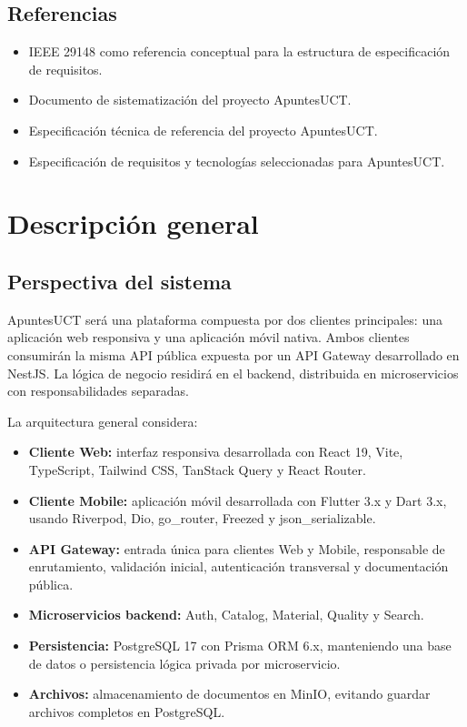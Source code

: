 \documentclass[12pt,a4paper]{article}
\begin{document}
\subsection{Referencias}

\begin{itemize}
    \item IEEE 29148 como referencia conceptual para la estructura de especificación de requisitos.
    \item Documento de sistematización del proyecto ApuntesUCT.
    \item Especificación técnica de referencia del proyecto ApuntesUCT.
    \item Especificación de requisitos y tecnologías seleccionadas para ApuntesUCT.
\end{itemize}

\section{Descripción general}

\subsection{Perspectiva del sistema}

ApuntesUCT será una plataforma compuesta por dos clientes principales: una aplicación web responsiva y una aplicación móvil nativa. Ambos clientes consumirán la misma API pública expuesta por un API Gateway desarrollado en NestJS. La lógica de negocio residirá en el backend, distribuida en microservicios con responsabilidades separadas.

La arquitectura general considera:

\begin{itemize}
    \item \textbf{Cliente Web:} interfaz responsiva desarrollada con React 19, Vite, TypeScript, Tailwind CSS, TanStack Query y React Router.
    \item \textbf{Cliente Mobile:} aplicación móvil desarrollada con Flutter 3.x y Dart 3.x, usando Riverpod, Dio, go\_router, Freezed y json\_serializable.
    \item \textbf{API Gateway:} entrada única para clientes Web y Mobile, responsable de enrutamiento, validación inicial, autenticación transversal y documentación pública.
    \item \textbf{Microservicios backend:} Auth, Catalog, Material, Quality y Search.
    \item \textbf{Persistencia:} PostgreSQL 17 con Prisma ORM 6.x, manteniendo una base de datos o persistencia lógica privada por microservicio.
    \item \textbf{Archivos:} almacenamiento de documentos en MinIO, evitando guardar archivos completos en PostgreSQL.
\end{itemize}
\end{document}
